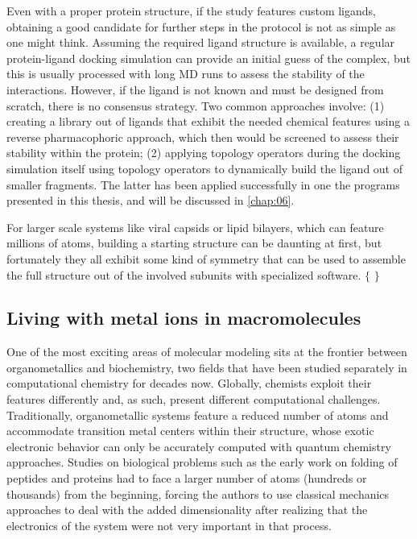 Even with a proper protein structure, if the study features custom ligands, obtaining a good candidate for further steps in the protocol is not as simple as one might think. Assuming the required ligand structure is available, a regular protein-ligand docking simulation can provide an initial guess of the complex, but this is usually processed with long MD runs to assess the stability of the interactions. However, if the ligand is not known and must be designed from scratch, there is no consensus strategy. Two common approaches involve: (1) creating a library out of ligands that exhibit the needed chemical features using a reverse pharmacophoric approach, which then would be screened to assess their stability within the protein; (2) applying topology operators during the docking simulation itself using topology operators to dynamically build the ligand out of smaller fragments. The latter has been applied successfully in one the programs presented in this thesis, and will be discussed in \autoref{chap:06}.

For larger scale systems like viral capsids or lipid bilayers, which can feature millions of atoms, building a starting structure can be daunting at first, but fortunately they all exhibit some kind of symmetry that can be used to assemble the full structure out of the involved subunits with specialized software. $ \{ $ $ \} $

\subsection{Living with metal ions in macromolecules}
One of the most exciting areas of molecular modeling sits at the frontier between organometallics and biochemistry, two fields that have been studied separately in computational chemistry for decades now. Globally, chemists exploit their features differently and, as such, present different computational challenges. Traditionally, organometallic systems feature a reduced number of atoms and accommodate transition metal centers within their structure, whose exotic electronic behavior can only be accurately computed with quantum chemistry approaches. Studies on biological problems such as the early work on folding of peptides and proteins had to face a larger number of atoms (hundreds or thousands) from the beginning, forcing the authors to use classical mechanics approaches to deal with the added dimensionality after realizing that the electronics of the system were not very important in that process.

